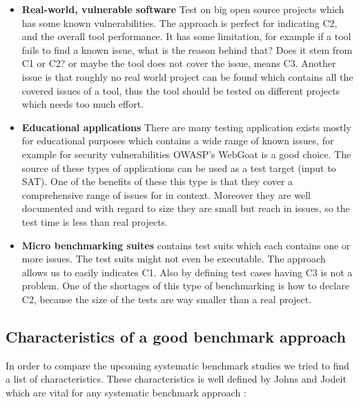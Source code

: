 \documentclass[authoryear,preprint]{sigplanconf}
\begin{document}
\begin{itemize}
	\item \textbf{Real-world, vulnerable software} Test on big open source projects which has some known vulnerabilities. The approach is perfect for indicating C2, and the overall tool performance. It has some limitation, for example if a tool fails to find a known issue, what is the reason behind that? Does it stem from C1 or C2? or maybe the tool does not cover the issue, means C3. Another issue is that roughly no real world project can be found which contains all the covered issues of a tool, thus the tool should be tested on different projects which needs too much effort. 
	
	\item \textbf{Educational applications} There are many testing application exists mostly for educational purposes which contains a wide range of known issues, for example for security vulnerabilities OWASP’s WebGoat \cite{owasp} is a good choice. The source of these types of applications can be used as a test target (input to SAT). One of the benefits of these this type is that they cover a comprehensive range of issues for in context. Moreover they are well documented and with regard to size they are small but reach in issues, so the test time is less than real projects. 
	
	\item \textbf{Micro benchmarking suites} contains test suits which each contains one or more issues. The test suits might not even be executable. The approach allows us to easily indicates C1. Also by defining test cases having C3 is not a problem. One of the shortages of this type of benchmarking is how to declare C2, because the size of the tests are way smaller than a real project. 
\end{itemize}

\subsection{Characteristics of a good benchmark approach}
\label{sec:good_benchmark}

In order to compare the upcoming systematic benchmark studies we tried to find a list of characteristics. These characteristics is well defined by Johns and Jodeit which are vital for any systematic benchmark approach \cite{Scanstud}:
\end{document}
